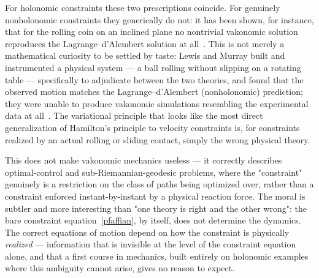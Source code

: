 For holonomic constraints these two prescriptions coincide. For
genuinely nonholonomic constraints they generically do not: it has
been shown, for instance, that for the rolling coin on an inclined
plane no nontrivial vakonomic solution reproduces the
Lagrange--d'Alembert solution at
all~\cite{zampieri}. This is not merely a
mathematical curiosity to be settled by taste: Lewis and Murray
built and instrumented a physical system --- a ball rolling without
slipping on a rotating table --- specifically to adjudicate between
the two theories, and found that the observed motion matches the
Lagrange--d'Alembert (nonholonomic) prediction; they were unable to
produce vakonomic simulations resembling the experimental data at
all~\cite{lewis+murray}. The variational principle that looks like
the most direct generalization of Hamilton's principle to velocity
constraints is, for constraints realized by an actual rolling or
sliding contact, simply the wrong physical theory.

This does not make vakonomic mechanics useless --- it correctly
describes optimal-control and sub-Riemannian-geodesic problems, where
the "constraint" genuinely is a restriction on the class of paths
being optimized over, rather than a constraint enforced
instant-by-instant by a physical reaction force. The moral is
subtler and more interesting than "one theory is right and the other
wrong": the bare constraint equation~\eqref{pfaffian}, by itself,
does not determine the dynamics. The correct equations of motion
depend on how the constraint is physically \emph{realized} ---
information that is invisible at the level of the constraint
equation alone, and that a first course in mechanics, built entirely
on holonomic examples where this ambiguity cannot arise, gives no
reason to expect.
